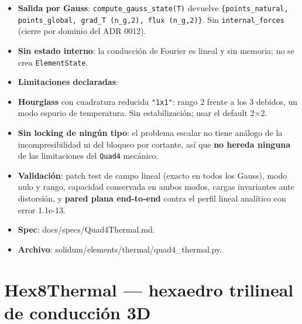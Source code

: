 \documentclass[11pt,letterpaper,oneside]{report}
\begin{document}
\begin{itemize}
  \item \textbf{Salida por Gauss}: \texttt{compute\_gauss\_state(T)} devuelve \texttt{\{points\_natural, points\_global, grad\_T (n\_g,2), flux (n\_g,2)\}}. Sin \texttt{internal\_forces} (cierre por dominio del ADR 0012).
  \item \textbf{Sin estado interno}: la conducción de Fourier es lineal y sin memoria; no se crea \texttt{ElementState}.
  \item \textbf{Limitaciones declaradas}:
  \item \textbf{Hourglass} con cuadratura reducida \texttt{"1x1"}: rango 2 frente a los 3 debidos, un modo espurio de temperatura. Sin estabilización; usar el default 2\ensuremath{\times}2.
  \item \textbf{Sin locking de ningún tipo}: el problema escalar no tiene análogo de la incompresibilidad ni del bloqueo por cortante, así que \textbf{no hereda ninguna} de las limitaciones del \texttt{Quad4} mecánico.
  \item \textbf{Validación}: patch test de campo lineal (exacto en todos los Gauss), modo nulo y rango, capacidad conservada en ambos modos, cargas invariantes ante distorsión, y \textbf{pared plana end-to-end} contra el perfil lineal analítico con error 1.1e-13.
  \item \textbf{Spec}: docs/specs/Quad4Thermal.md.
  \item \textbf{Archivo}: solidum/elements/thermal/quad4\_thermal.py.
\end{itemize}

\section{Hex8Thermal --- hexaedro trilineal de conducción 3D}
\end{document}
